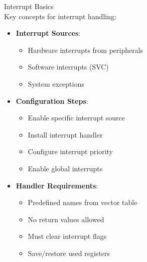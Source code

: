 \begin{corollary}{Interrupt Basics}\\
Key concepts for interrupt handling:
\begin{itemize}
  \item \textbf{Interrupt Sources}:
    \begin{itemize}
      \item Hardware interrupts from peripherals
      \item Software interrupts (SVC)
      \item System exceptions
    \end{itemize}
  \item \textbf{Configuration Steps}:
    \begin{itemize}
      \item Enable specific interrupt source
      \item Install interrupt handler
      \item Configure interrupt priority
      \item Enable global interrupts
    \end{itemize}
  \item \textbf{Handler Requirements}:
    \begin{itemize}
      \item Predefined names from vector table
      \item No return values allowed
      \item Must clear interrupt flags
      \item Save/restore used registers
    \end{itemize}
\end{itemize}
\end{corollary}

